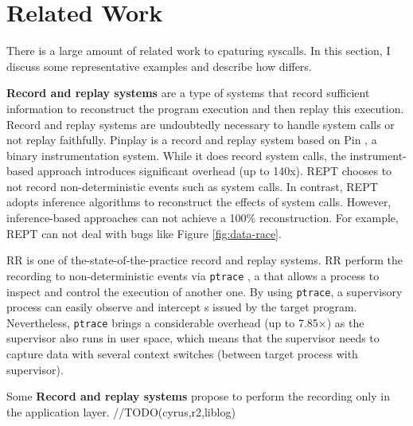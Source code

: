 \section{Related Work}

There is a large amount of related work to cpaturing syscalls. In this section, I discuss some representative examples and describe
how \TheName differs.

\textbf{Record and replay systems} are a type of systems that record sufficient information to reconstruct the program execution and then replay this execution. Record and replay systems are undoubtedly necessary to handle system calls or not replay faithfully.
Pinplay \cite{patil_pinplay_2010} is a record and replay system based on Pin  \cite{reddi_pin_2004}, a binary instrumentation system. While it does record system calls, the instrument-based approach introduces significant overhead (up to 140x). REPT \cite{cui_rept_2018} chooses to not record non-deterministic events such as system calls. In contrast, REPT adopts inference algorithms to reconstruct the effects of system calls. However, inference-based approaches can not achieve a 100\% reconstruction. For example, REPT can not deal with bugs like Figure \ref{fig:data-race}.

RR \cite{203227} is one of the-state-of-the-practice record and replay systems. RR perform the recording to non-deterministic events via \texttt{ptrace} \cite{ptrace2},
a \syscall{}
that allows a process to inspect and control the execution of another
one.
By using \texttt{ptrace}, a supervisory process can easily observe and intercept \syscall{}s issued by the target program.
Nevertheless,
\texttt{ptrace} brings a considerable overhead (up to 7.85×) as the supervisor also runs in
user space, 
which means that the supervisor needs to capture data with several
context switches (between target process with supervisor).

Some \textbf{Record and replay systems} propose to perform the recording only in the application layer. //TODO(cyrus,r2,liblog)


